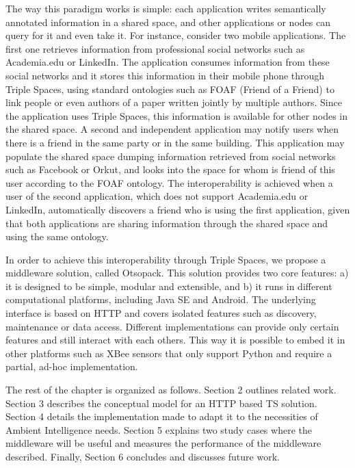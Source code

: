 The way this paradigm works is simple: each application writes semantically annotated information in a shared space,
and other applications or nodes can query for it and even take it. For instance, consider two mobile applications. The
first one retrieves information from professional social networks such as Academia.edu or LinkedIn. The application
consumes information from these social networks and it stores this information in their mobile phone through Triple
Spaces, using standard ontologies such as FOAF (Friend of a Friend) to link people or even authors of a paper written
jointly by multiple authors. Since the application uses Triple Spaces, this information is available for other nodes in
the shared space. A second and independent application may notify users when there is a friend in the same party or in
the same building. This application may populate the shared space dumping information retrieved from social networks
such as Facebook or Orkut, and looks into the space for whom is friend of this user according to the FOAF ontology. The
interoperability is achieved when a user of the second application, which does not support Academia.edu or LinkedIn,
automatically discovers a friend who is using the first application, given that both applications are sharing
information through the shared space and using the same ontology.

In order to achieve this interoperability through Triple Spaces, we propose a middleware solution, called
Otsopack. This solution provides two core features: a) it is designed to be simple, modular and extensible, and b) it
runs in different computational platforms, including Java SE and Android. The underlying interface is based on HTTP and
covers isolated features such as discovery, maintenance or data access. Different implementations can provide
only certain features and still interact with each others. This way it is possible to embed it in other platforms such
as XBee sensors that only support Python and require a partial, ad-hoc implementation.

The rest of the chapter is organized as follows. Section 2 outlines related work. Section 3 describes the conceptual model
for an HTTP based TS solution. Section 4 details the implementation made to adapt it to the necessities of Ambient
Intelligence needs. Section 5 explains two study cases where the middleware will be useful and measures the performance
of the middleware described. Finally, Section 6 concludes and discusses future work.

